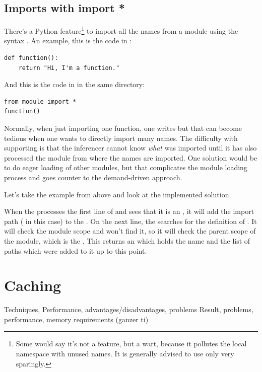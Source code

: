 \documentclass[12pt,halfparskip]{scrreprt}
\begin{document}
\subsection{Imports with import *}

There's a Python feature\footnote{Some would say it's not a feature, but a wart, because it pollutes the local namespace with unused names. It is generally advised to use  only very sparingly.} to import all the names from a module using the syntax . An example, this is the code in :

\begin{lstlisting}
def function():
    return "Hi, I'm a function."
\end{lstlisting}

And this is the code in  in the same directory:

\begin{lstlisting}
from module import *
function()
\end{lstlisting}

Normally, when just importing one function, one writes  but that can become tedious when one wants to directly import many names. The difficulty with supporting  is that the inferencer cannot know \emph{what} was imported until it has also processed the module from where the names are imported. One solution would be to do eager loading of other modules, but that complicates the module loading process and goes counter to the demand-driven approach.

Let's take the example from above and look at the implemented solution.

When the  processes the first line of  and sees that it is an , it will add the import path ( in this case) to the . On the next line, the  searches for the definition of . It will check the module scope and won't find it, so it will check the parent scope of the module, which is the . This returns an  which holds the name and the list of  paths which were added to it up to this point.


\section{Caching}
 Techniques, Performance, advantages/disadvantages, problems
 Result, problems, performance, memory requirements (ganzer ti)
\end{document}
